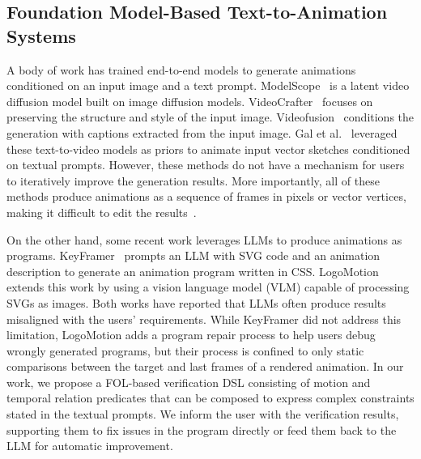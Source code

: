 \subsection{Foundation Model-Based Text-to-Animation Systems}
A body of work has trained end-to-end models to generate animations conditioned on an input image and a text prompt.
ModelScope~\cite{wang2023modelscope} is a latent video diffusion model built on image diffusion models.
VideoCrafter~\cite{chen2024videocrafter2} focuses on preserving the structure and style of the input image.
Videofusion~\cite{luo2023videofusion} conditions the generation with captions extracted from the input image.
Gal et al.~ leveraged these text-to-video models as priors to animate input vector sketches conditioned on textual prompts.
However, these methods do not have a mechanism for users to iteratively improve the generation results.
More importantly, all of these methods produce animations as a sequence of frames in pixels or vector vertices, making it difficult to edit the results~\cite{zhang2023motion}.

On the other hand, some recent work leverages LLMs to produce animations as programs.
KeyFramer~\cite{tseng2024keyframer} prompts an LLM with SVG code and an animation description to generate an animation program written in CSS.
LogoMotion~\cite{liu2024logomotion} extends this work by using a vision language model (VLM) capable of processing SVGs as images.
%
Both works have reported that LLMs often produce results misaligned with the users' requirements.
While KeyFramer did not address this limitation, LogoMotion adds a program repair process to help users debug wrongly generated programs, but their process is confined to only static comparisons between the target and last frames of a rendered animation.
%
In our work, we propose a FOL-based verification DSL consisting of motion and temporal relation predicates that can be composed to express complex constraints stated in the textual prompts.
We inform the user with the verification results, supporting them to fix issues in the program directly or feed them back to the LLM for automatic improvement.


